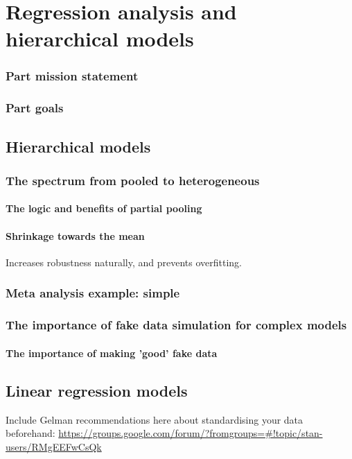 \documentclass[11pt,fullpage]{book}
\begin{document}
\part{Regression analysis and hierarchical models}\label{part:regressionHierarchical}
\section{Part mission statement}
\section{Part goals}

\chapter{Hierarchical models}\label{chap:hierarchicalModels}
\section{The spectrum from pooled to heterogeneous}
\subsection{The logic and benefits of partial pooling}
\subsection{Shrinkage towards the mean}
Increases robustness naturally, and prevents overfitting.

\section{Meta analysis example: simple}

\section{The importance of fake data simulation for complex models}
\subsection{The importance of making 'good' fake data}

\chapter{Linear regression models}
Include Gelman recommendations here about standardising your data beforehand: \url{https://groups.google.com/forum/?fromgroups=#!topic/stan-users/RMgEEFwCsQk}
\end{document}
